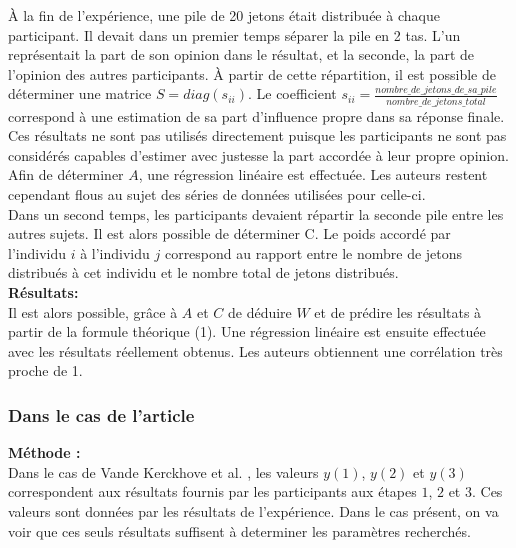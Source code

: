 \documentclass{scrreprt}
\begin{document}


À la fin de l'expérience, une pile de 20 jetons était distribuée à chaque participant. Il devait dans un premier temps séparer la pile en 2 tas. L'un représentait la part de son opinion dans le résultat, et la seconde, la part de l'opinion des autres participants. À partir de cette répartition, il est possible de déterminer une matrice $S = diag(s_{ii})$. Le coefficient $s_{ii} = \frac{nombre\_de\_jetons\_de\_sa\_pile}{nombre\_de\_jetons\_total}$ correspond à une estimation de sa part d'influence propre dans sa réponse finale. Ces résultats ne sont pas utilisés directement puisque les participants ne sont pas considérés capables d'estimer avec justesse la part accordée à leur propre opinion. Afin de déterminer $A$, une régression linéaire est effectuée. Les auteurs restent cependant flous au sujet des séries de données utilisées pour celle-ci.\\

Dans un second temps, les participants devaient répartir la seconde pile entre les autres sujets. Il est alors possible de déterminer C. Le poids accordé par l'individu $i$ à l'individu $j$ correspond au rapport entre le nombre de jetons distribués à cet individu et le nombre total de jetons distribués.\\

\textbf{Résultats:}\\

Il est alors possible, grâce à $A$ et $C$ de déduire $W$ et de prédire les résultats à partir de la formule théorique (1). Une régression linéaire est ensuite effectuée avec les résultats réellement obtenus. Les auteurs obtiennent une corrélation très proche de 1.
 
\subsubsection{Dans le cas de l'article \cite{VMG}}

\textbf{Méthode :} \\

Dans le cas de Vande Kerckhove et al. \cite{VMG}, les valeurs $y(1)$, $y(2)$ et $y(3)$ correspondent aux résultats fournis par les participants aux étapes $1$, $2$ et $3$. Ces valeurs sont données par les résultats de l'expérience. Dans le cas présent, on va voir que ces seuls résultats suffisent à determiner les paramètres recherchés.\\
\end{document}
